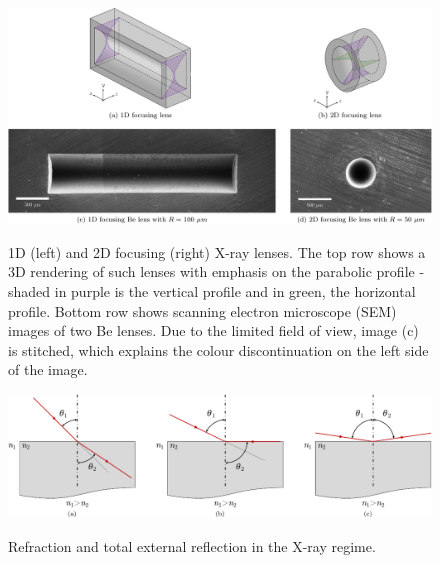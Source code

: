\begin{refsection}
\begin{figure}[t]
    \centering
    {\includegraphics[width=.8\linewidth]{figures/ch03/1D2D.pdf}}
    \caption[1D and 2D focusing X-ray lenses]{1D (left) and 2D focusing (right) X-ray lenses. The top row shows a 3D rendering of such lenses with emphasis on the parabolic profile - shaded in purple is the vertical profile and in green, the horizontal profile. Bottom row shows scanning electron microscope (SEM) images of two Be lenses. Due to the limited field of view, image (c) is stitched, which explains the colour discontinuation on the left side of the image.} 
    \label{fig:1D2D_lenses}
\end{figure}

\begin{figure}[t]
    \centering
    {\includegraphics[width=0.7\linewidth]{figures/ch03/reflection_refraction.pdf}}
    \caption[Refraction and total external reflection in the X-ray regime]{Refraction and total external reflection in the X-ray regime.}
    \label{fig:reflection_refraction}
\end{figure}


\end{refsection}
